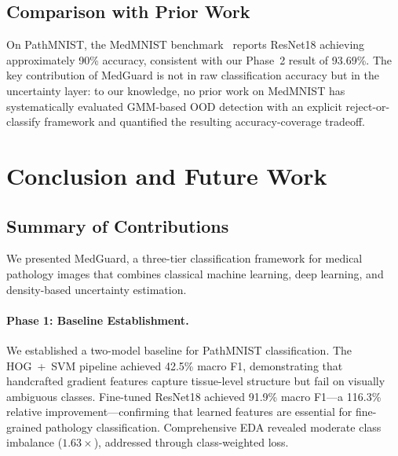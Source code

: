 \documentclass{article}
\begin{document}
\subsection{Comparison with Prior Work}

On PathMNIST, the MedMNIST benchmark~\citep{yang2023medmnist} reports ResNet18 achieving approximately 90\% accuracy, consistent with our Phase~2 result of 93.69\%. The key contribution of MedGuard is not in raw classification accuracy but in the uncertainty layer: to our knowledge, no prior work on MedMNIST has systematically evaluated GMM-based OOD detection with an explicit reject-or-classify framework and quantified the resulting accuracy-coverage tradeoff.

\section{Conclusion and Future Work}
\label{sec:conclusion}

\subsection{Summary of Contributions}

We presented MedGuard, a three-tier classification framework for medical pathology images that combines classical machine learning, deep learning, and density-based uncertainty estimation.

\paragraph{Phase 1: Baseline Establishment.}
We established a two-model baseline for PathMNIST classification. The HOG~+~SVM pipeline achieved 42.5\% macro F1, demonstrating that handcrafted gradient features capture tissue-level structure but fail on visually ambiguous classes. Fine-tuned ResNet18 achieved 91.9\% macro F1---a 116.3\% relative improvement---confirming that learned features are essential for fine-grained pathology classification. Comprehensive EDA revealed moderate class imbalance ($1.63\times$), addressed through class-weighted loss.
\end{document}
